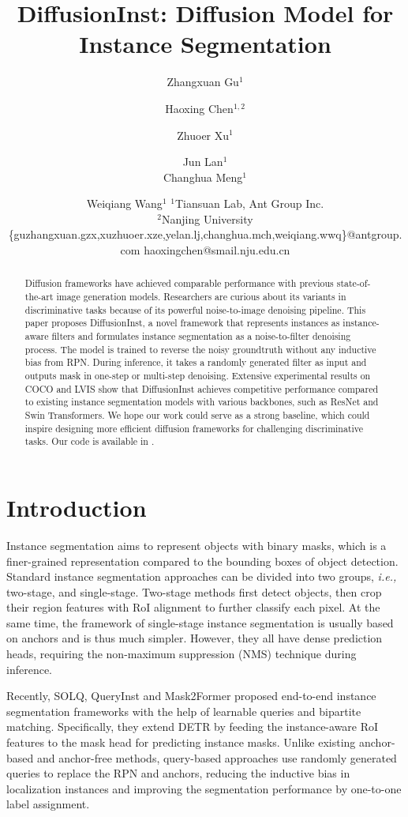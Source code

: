 \documentclass{article}
\title{DiffusionInst: Diffusion Model for Instance Segmentation}
\author{
Zhangxuan Gu$^1$
\and
Haoxing Chen$^{1,2}$\and
Zhuoer Xu$^1$\and
Jun Lan$^1$ \\
Changhua Meng$^1$\and
Weiqiang Wang$^1$
\affiliations
$^1$Tiansuan Lab, Ant Group Inc.\\
$^2$Nanjing University
\emails
 \{guzhangxuan.gzx,xuzhuoer.xze,yelan.lj,changhua.mch,weiqiang.wwq\}@antgroup.com haoxingchen@smail.nju.edu.cn}
\begin{document}
\maketitle

\begin{abstract}
Diffusion frameworks have achieved comparable performance with previous state-of-the-art image generation models. Researchers are curious about its variants in discriminative tasks because of its powerful noise-to-image denoising pipeline. This paper proposes DiffusionInst, a novel framework that represents instances as instance-aware filters and formulates instance segmentation as a noise-to-filter denoising process. The model is trained to reverse the noisy groundtruth without any inductive bias from RPN.
During inference, it takes a randomly generated filter as input and outputs mask in one-step or multi-step denoising. Extensive experimental results on COCO and LVIS show that DiffusionInst achieves competitive performance compared to existing instance segmentation models with various backbones, such as ResNet and Swin Transformers. We hope our work could serve as a strong baseline, which could inspire designing more efficient diffusion frameworks for challenging discriminative tasks. Our code is available in \textit{}.
\end{abstract}

\section{Introduction}

Instance segmentation aims to represent objects with binary masks, which is a finer-grained representation compared to the bounding boxes of object detection. Standard instance segmentation approaches can be divided into two groups, {\em i.e.,} two-stage\cite{maskrcnn,PANet,maskscoringrcnn}, and single-stage\cite{BlendMask,YOLACT,SOLO,SOLOv2,CondInst}. Two-stage methods first detect objects, then crop their region features with RoI alignment to further classify each pixel. At the same time, the framework of single-stage instance segmentation is usually based on anchors and is thus much simpler. However, they all have dense prediction heads, requiring the non-maximum suppression (NMS) technique during inference.



Recently, SOLQ\cite{dong2021solq}, QueryInst\cite{QueryInst} and Mask2Former\cite{Mask2Former} proposed end-to-end instance segmentation frameworks with the help of learnable queries and bipartite matching. Specifically, they extend DETR\cite{DETR} by feeding the instance-aware RoI features to the mask head for predicting instance masks. Unlike existing anchor-based and anchor-free methods, query-based approaches use randomly generated queries to replace the RPN and anchors, reducing the inductive bias in localization instances and improving the segmentation performance by one-to-one label assignment.
\end{document}
